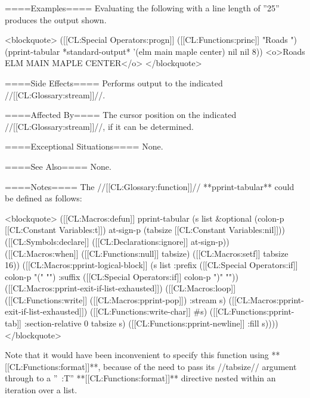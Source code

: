 ====Examples====
Evaluating the following with a line length of ''25'' produces the output shown.

<blockquote>
([[CL:Special Operators:progn]] 
  ([[CL:Functions:princ]] "Roads ") 
  (pprint-tabular *standard-output* '(elm main maple center) nil nil 8))
<o>Roads ELM     MAIN
      MAPLE   CENTER</o>
</blockquote>

====Side Effects====
Performs output to the indicated //[[CL:Glossary:stream]]//.

====Affected By====
The cursor position on the indicated //[[CL:Glossary:stream]]//, if it can be determined.

====Exceptional Situations====
None.

====See Also====
None.

====Notes====
The //[[CL:Glossary:function]]// **pprint-tabular** could be defined as follows:

<blockquote>
([[CL:Macros:defun]] pprint-tabular (s list &optional (colon-p [[CL:Constant Variables:t]]) at-sign-p (tabsize [[CL:Constant Variables:nil]]))
  ([[CL:Symbols:declare]] ([[CL:Declarations:ignore]] at-sign-p)) 
  ([[CL:Macros:when]] ([[CL:Functions:null]] tabsize) 
    ([[CL:Macros:setf]] tabsize 16)) 
  ([[CL:Macros:pprint-logical-block]] (s list :prefix ([[CL:Special Operators:if]] colon-p "(" "") 
                                :suffix ([[CL:Special Operators:if]] colon-p ")" ""))
    ([[CL:Macros:pprint-exit-if-list-exhausted]]) 
    ([[CL:Macros:loop]] ([[CL:Functions:write]] ([[CL:Macros:pprint-pop]]) :stream s) 
          ([[CL:Macros:pprint-exit-if-list-exhausted]]) 
          ([[CL:Functions:write-char]] #\Space s) 
          ([[CL:Functions:pprint-tab]] :section-relative 0 tabsize s) 
          ([[CL:Functions:pprint-newline]] :fill s))))
</blockquote>

Note that it would have been inconvenient to specify this function using **[[CL:Functions:format]]**, because of the need to pass its //tabsize// argument through to a ''~:T'' **[[CL:Functions:format]]** directive nested within an iteration over a list.

 
